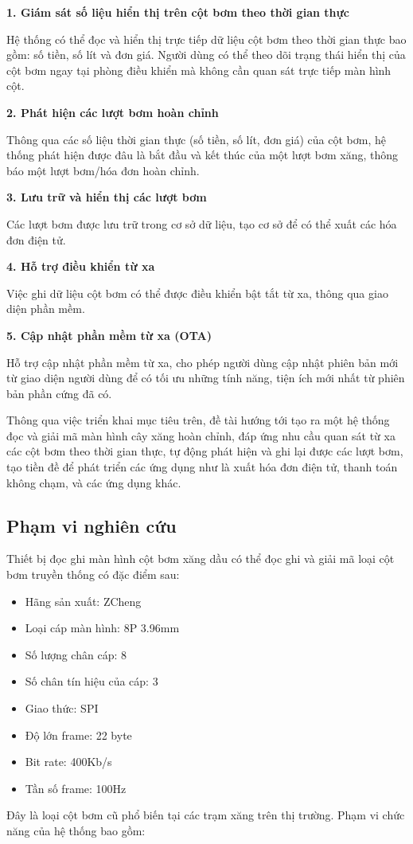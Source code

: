  \hspace{1cm} 

 \textbf{1. \quad Giám sát số liệu hiển thị trên cột bơm theo thời gian thực}

 Hệ thống có thể đọc và hiển thị trực tiếp dữ liệu cột bơm theo thời gian thực bao gồm: số tiền, số lít và đơn giá. Người dùng có thể theo dõi trạng thái hiển thị của cột bơm ngay tại phòng điều khiển mà không cần quan sát trực tiếp màn hình cột.
 

 \textbf{
    2. \quad  Phát hiện các lượt bơm hoàn chỉnh
 }

 Thông qua các số liệu thời gian thực (số tiền, số lít, đơn giá) của cột bơm, hệ thống phát hiện được đâu là bắt đầu và kết thúc của một lượt bơm xăng, thông báo một lượt bơm/hóa đơn hoàn chỉnh.


 \textbf{
    3. \quad Lưu trữ và hiển thị các lượt bơm
 }

 Các lượt bơm được lưu trữ trong cơ sở dữ liệu, tạo cơ sở để có thể xuất các hóa đơn điện tử.


 \textbf{
    4. \quad Hỗ trợ điều khiển từ xa
 }

 Việc ghi dữ liệu cột bơm có thể được điều khiển bật tắt từ xa, thông qua giao diện phần mềm.


 \textbf{
    5. \quad Cập nhật phần mềm từ xa (OTA)
 }

 Hỗ trợ cập nhật phần mềm từ xa, cho phép người dùng cập nhật phiên bản mới từ giao diện người dùng để có tối ưu những tính năng, tiện ích mới nhất từ phiên bản phần cứng đã có.

Thông qua việc triển khai mục tiêu trên, đề tài hướng tới tạo ra một hệ thống đọc và giải mã màn hình cây xăng hoàn chỉnh, đáp ứng nhu cầu quan sát từ xa các cột bơm theo thời gian thực, tự động phát hiện và ghi lại được các lượt bơm, tạo tiền đề để phát triển các ứng dụng như là xuất hóa đơn điện tử, thanh toán không chạm, và các ứng dụng khác.

\subsection{Phạm vi nghiên cứu}

\hspace{1cm} Thiết bị đọc ghi màn hình cột bơm xăng dầu có thể đọc ghi và giải mã loại cột bơm truyền thống có đặc điểm sau:
\begin{itemize}
   \item Hãng sản xuất: ZCheng
   \item Loại cáp màn hình: 8P 3.96mm
   \item Số lượng chân cáp: 8
   \item Số chân tín hiệu của cáp: 3
   \item Giao thức: SPI
   \item Độ lớn frame: 22 byte
   \item Bit rate: 400Kb/s
   \item Tần số frame: 100Hz
\end{itemize}
Đây là loại cột bơm cũ phổ biến tại các trạm xăng trên thị trường. Phạm vi chức năng của hệ thống bao gồm:

